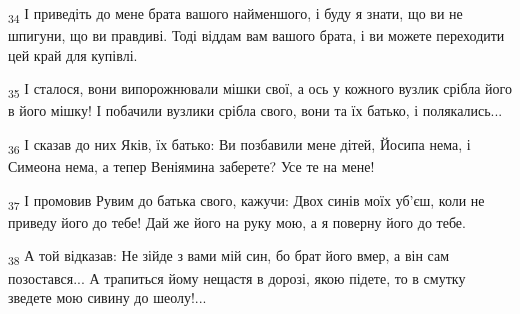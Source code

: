 \begin{tcolorbox}
\textsubscript{34} І приведіть до мене брата вашого найменшого, і буду я знати, що ви не шпигуни, що ви правдиві. Тоді віддам вам вашого брата, і ви можете переходити цей край для купівлі.
\end{tcolorbox}
\begin{tcolorbox}
\textsubscript{35} І сталося, вони випорожнювали мішки свої, а ось у кожного вузлик срібла його в його мішку! І побачили вузлики срібла свого, вони та їх батько, і полякались...
\end{tcolorbox}
\begin{tcolorbox}
\textsubscript{36} І сказав до них Яків, їх батько: Ви позбавили мене дітей, Йосипа нема, і Симеона нема, а тепер Веніямина заберете? Усе те на мене!
\end{tcolorbox}
\begin{tcolorbox}
\textsubscript{37} І промовив Рувим до батька свого, кажучи: Двох синів моїх уб'єш, коли не приведу його до тебе! Дай же його на руку мою, а я поверну його до тебе.
\end{tcolorbox}
\begin{tcolorbox}
\textsubscript{38} А той відказав: Не зійде з вами мій син, бо брат його вмер, а він сам позостався... А трапиться йому нещастя в дорозі, якою підете, то в смутку зведете мою сивину до шеолу!...
\end{tcolorbox}
